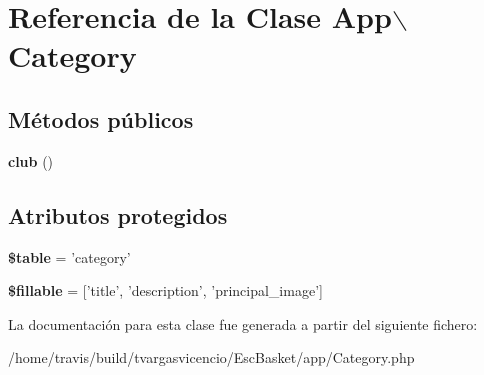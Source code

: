 \hypertarget{class_app_1_1_category}{\section{\-Referencia de la \-Clase \-App$\backslash$\-Category}
\label{class_app_1_1_category}
}
\subsection*{\-Métodos públicos}
\begin{DoxyCompactItemize}
\item 
\hypertarget{class_app_1_1_category_a3f261e044c6448f0aa20045acd9d5eab}{{\bfseries club} ()}\label{class_app_1_1_category_a3f261e044c6448f0aa20045acd9d5eab}

\end{DoxyCompactItemize}
\subsection*{\-Atributos protegidos}
\begin{DoxyCompactItemize}
\item 
\hypertarget{class_app_1_1_category_a61f54ce29ac0aa2094b266cbf47ea833}{{\bfseries \$table} = 'category'}\label{class_app_1_1_category_a61f54ce29ac0aa2094b266cbf47ea833}

\item 
\hypertarget{class_app_1_1_category_a92728a96ec25a30baf261b7a5ea3e5a4}{{\bfseries \$fillable} = \mbox{[}'title', 'description', 'principal\-\_\-image'\mbox{]}}\label{class_app_1_1_category_a92728a96ec25a30baf261b7a5ea3e5a4}

\end{DoxyCompactItemize}


\-La documentación para esta clase fue generada a partir del siguiente fichero\-:\begin{DoxyCompactItemize}
\item 
/home/travis/build/tvargasvicencio/\-Esc\-Basket/app/\-Category.\-php\end{DoxyCompactItemize}
